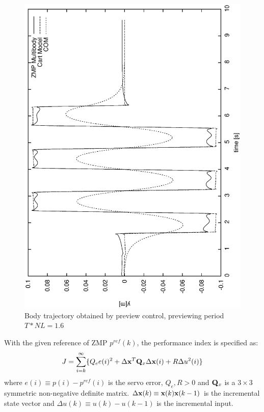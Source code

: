 \begin{figure}[htb]
\begin{center}
\includegraphics[width=\linewidth]{./figures/PatternGenerator/SecondFigureZMPMB_Y}
\caption{Body trajectory obtained by preview control, previewing period $T * NL = 1.6$ }
\label{pic:ZMPMB}
\end{center}
\end{figure}
\clearpage
With the given reference of ZMP $p^{ref}(k)$, the performance
index is specified as:
\begin{equation}
J = \sum^{\infty}_{i=k} \{ Q_ee(i)^2 + \Delta{\bf x}^T {\bf Q}_x \Delta{\bf x}(i) +
R \Delta u^2(i) \}
\label{eq:PerformanceIndex1}
\end{equation}
where $e(i) \equiv p(i) - p^{ref}(i)$ is the servo error, $Q_e,R > 0$ and ${\bf Q}_x$ is
a $3 \times 3$ symmetric non-negative definite matrix.
$\Delta {\bf x} (k) \equiv {\bf x}(k) {\bf x}(k-1)$ is the incremental state vector
and $\Delta u(k) \equiv u(k) - u(k-1)$ is the incremental input.
